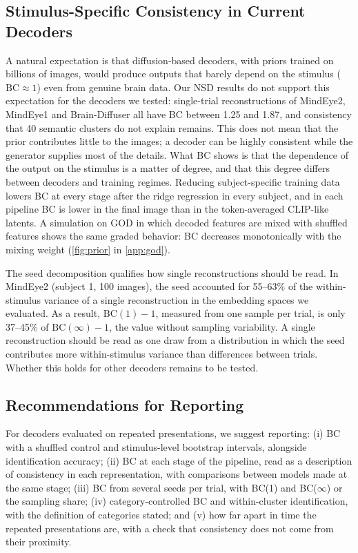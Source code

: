 \documentclass[11pt,a4paper]{article}
\begin{document}
\subsection{Stimulus-Specific Consistency in Current Decoders}

A natural expectation is that diffusion-based decoders, with priors trained on
billions of images, would produce outputs that barely depend on the stimulus
($\mathrm{BC}\approx1$) even from genuine brain data. Our NSD results do not
support this expectation for the decoders we tested: single-trial
reconstructions of MindEye2, MindEye1 and Brain-Diffuser all have BC between
1.25 and 1.87, and consistency that 40 semantic clusters do not explain
remains. This does not mean that the prior contributes little to the images; a
decoder can be highly consistent while the generator supplies most of the
details. What BC shows is that the dependence of the output on the stimulus is
a matter of degree, and that this degree differs between decoders and training
regimes. Reducing subject-specific training data lowers BC at
every stage after the ridge regression in every subject, and in each pipeline
BC is lower in the final image than in the token-averaged CLIP-like latents. A
simulation on GOD in which decoded features are mixed with shuffled features
shows the same graded behavior: BC decreases monotonically with the mixing
weight (\cref{fig:prior} in \cref{app:god}).

The seed decomposition qualifies how single reconstructions should be read. In
MindEye2 (subject 1, 100 images), the seed accounted for 55--63\% of the
within-stimulus variance of a single reconstruction in the embedding spaces we
evaluated. As a result, $\mathrm{BC}(1)-1$, measured from one sample per trial,
is only 37--45\% of $\mathrm{BC}(\infty)-1$, the value without sampling
variability. A single reconstruction should be read as one draw from a
distribution in which the seed contributes more within-stimulus variance than
differences between trials. Whether this holds for other decoders remains to be
tested.

\subsection{Recommendations for Reporting}

For decoders evaluated on repeated presentations, we suggest reporting:
(i) BC with a shuffled control and stimulus-level bootstrap intervals, alongside
identification accuracy; (ii) BC at each stage of the pipeline, read as a
description of consistency in each representation, with comparisons between
models made at the same stage; (iii) BC from several seeds per trial, with
BC(1) and BC($\infty$) or the sampling share; (iv) category-controlled BC and
within-cluster identification, with the definition of categories stated; and
(v) how far apart in time the repeated presentations are, with a check that
consistency does not come from their proximity.
\end{document}
